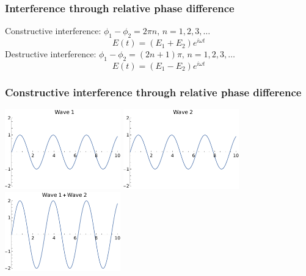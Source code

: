 \documentclass{beamer}
\begin{document}
\begin{frame}
  \frametitle{Interference through relative phase difference}
  Constructive interference: $ \phi_1 - \phi_2 = 2 \pi n \text{, } n = 1, 2, 3, \ldots$
  \pause
  \begin{equation*}
    E(t) = (E_1 + E_2) e^{i \omega t}
  \end{equation*}
  \pause
  Destructive interference: $\phi_1 - \phi_2 = (2 n + 1) \pi \text{, } n = 1, 2, 3, \ldots$
  \pause
  \begin{equation*}
    E(t) = (E_1 - E_2) e^{i \omega t}
  \end{equation*}
\end{frame}

\begin{frame}
  \frametitle{Constructive interference through relative phase difference}
  \begin{center}
  \includegraphics[width=5cm]{wave1pres} 
  \includegraphics[width=5cm]{wave2pres}
  \\
  \includegraphics[width=5cm]{constructivepres}
\end{center}
\end{frame}
\end{document}
